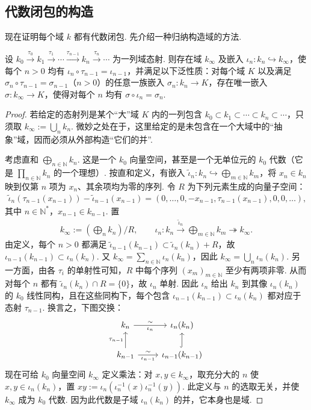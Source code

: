 \subsection{代数闭包的构造}\label{sec:galois-2-2-4}
现在证明每个域 $k$ 都有代数闭包. 先介绍一种归纳构造域的方法.
\begin{lemma*}
设 $k_0\xrightarrow{\tau_0}k_1\xrightarrow{\tau_1}\cdots\xrightarrow{\tau_{n-1}}k_n\xrightarrow{\tau_n}\cdots$ 为一列域态射. 则存在域 $k_\infty$ 及嵌入 $\iota_n:k_n\hookrightarrow k_\infty$，使每个 $n>0$ 均有 $\iota_n\circ\tau_{n-1}=\iota_{n-1}$，并满足以下泛性质：对每个域 $K$ 以及满足 $\sigma_n\circ\tau_{n-1}=\sigma_{n-1}$（$n>0$）的任意一族嵌入 $\sigma_n:k_n\to K$，存在唯一嵌入 $\sigma:k_\infty\to K$，使得对每个 $n$ 均有 $\sigma\circ\iota_n=\sigma_n$.
\end{lemma*}
\begin{proof}
若给定的态射列是某个``大''域 $K$ 内的一列包含 $k_0\subset k_1\subset\cdots\subset k_n\subset\cdots$，只须取 $k_\infty:=\bigcup_nk_n$. 微妙之处在于，这里给定的是未包含在一个大域中的``抽象''域，因而必须从外部构造``它们的并''.

考虑直和 $\bigoplus_{n\in\mathbb N}k_n$. 这是一个 $k_0$ 向量空间，甚至是一个无单位元的 $k_0$ 代数（它是 $\prod_{n\in\mathbb N}k_n$ 的一个理想）. 按直和定义，有嵌入 $\tilde\iota_n:k_n\hookrightarrow\bigoplus_{m\in\mathbb N}k_m$，将 $x_n\in k_n$ 映到仅第 $n$ 项为 $x_n$、其余项均为零的序列. 令 $R$ 为下列元素生成的向量子空间：
\begin{align*}
\tilde\iota_n(\tau_{n-1}(x_{n-1}))-\tilde\iota_{n-1}(x_{n-1})
=(0,\ldots,0,-x_{n-1},\tau_{n-1}(x_{n-1}),0,0,\ldots),
\end{align*}
其中 $n\in\mathbb N^*$，$x_{n-1}\in k_{n-1}$. 置
\begin{align*}
k_\infty:=\left(\bigoplus_n k_n\right)/R,\qquad
\iota_n:k_n\xrightarrow{\tilde\iota_n}\bigoplus_{m\in\mathbb N}k_m\twoheadrightarrow k_\infty.
\end{align*}
由定义，每个 $n>0$ 都满足 $\tilde\iota_{n-1}(k_{n-1})\subset\tilde\iota_n(k_n)+R$，故 $\iota_{n-1}(k_{n-1})\subset\iota_n(k_n)$. 又 $k_\infty=\sum_{n\in\mathbb N}\iota_n(k_n)$，因此 $k_\infty=\bigcup_n\iota_n(k_n)$. 另一方面，由各 $\tau_i$ 的单射性可知，$R$ 中每个序列 $(x_m)_{m\in\mathbb N}$ 至少有两项非零. 从而对每个 $n$ 都有 $\tilde\iota_n(k_n)\cap R=\{0\}$，故 $\iota_n$ 单射. 因此 $\iota_n$ 给出 $k_n$ 到其像 $\iota_n(k_n)$ 的 $k_0$ 线性同构，且在这些同构下，每个包含 $\iota_{n-1}(k_{n-1})\subset\iota_n(k_n)$ 都对应于态射 $\tau_{n-1}$. 换言之，下图交换：
\[
\begin{tikzcd}
k_n\arrow[r,"\sim" above,"\iota_n" below]&\iota_n(k_n)\\
k_{n-1}\arrow[u,"\tau_{n-1}"]\arrow[r,"\sim" above,"\iota_{n-1}" below]&\iota_{n-1}(k_{n-1})\arrow[u,hook]
\end{tikzcd}
\]
现在可给 $k_0$ 向量空间 $k_\infty$ 定义乘法：对 $x,y\in k_\infty$，取充分大的 $n$ 使 $x,y\in\iota_n(k_n)$，置 $xy:=\iota_n(\iota_n^{-1}(x)\iota_n^{-1}(y))$. 此定义与 $n$ 的选取无关，并使 $k_\infty$ 成为 $k_0$ 代数. 因为此代数是子域 $\iota_n(k_n)$ 的并，它本身也是域.


\end{proof}
